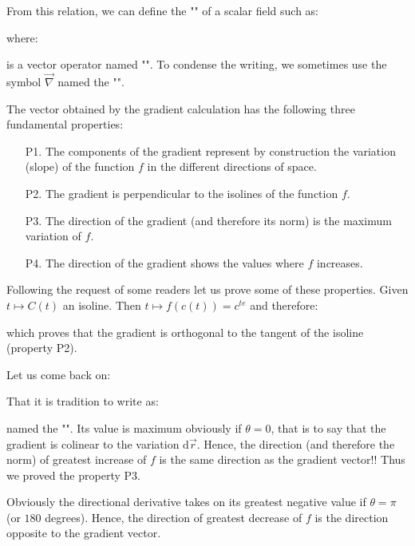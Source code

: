 	From this relation, we can define the "" of a scalar field such as:
	
	where:
	
	is a vector operator named "". To condense the writing, we sometimes use the symbol $\vec{\nabla}$ named the "".
	
	The vector obtained by the gradient calculation has the following three fundamental properties:
	\begin{enumerate}
		\item[P1.] The components of the gradient represent by construction the variation (slope) of the function $f$ in the different directions of space.
		
		\item[P2.] The gradient is perpendicular to the isolines of the function $f$.

		\item[P3.] The direction of the gradient (and therefore its norm) is the maximum variation of $f$.

		\item[P4.] The direction of the gradient shows the values where $f$ increases.
	\end{enumerate}
	Following the request of some readers let us prove some of these properties.
	Given $t\mapsto C(t)$ an isoline. Then $t\mapsto f(c(t))=c^{te}$ and therefore:
	  
	which proves that the gradient is orthogonal to the tangent of the isoline (property P2).
	
	Let us come back on:
	
	That it is tradition to write as:
	
	named the "". Its value is maximum obviously if $\theta=0$, that is to say that the gradient is colinear to the variation $\mathrm{d}\vec{r}$. Hence, the direction (and therefore the norm) of greatest increase of $f$ is the same direction as the gradient vector!! Thus we proved the property P3.
	
	Obviously the directional derivative takes on its greatest negative value if $\theta=\pi$ (or $180$ degrees). Hence, the direction of greatest decrease of $f$ is the direction opposite to the gradient vector.

